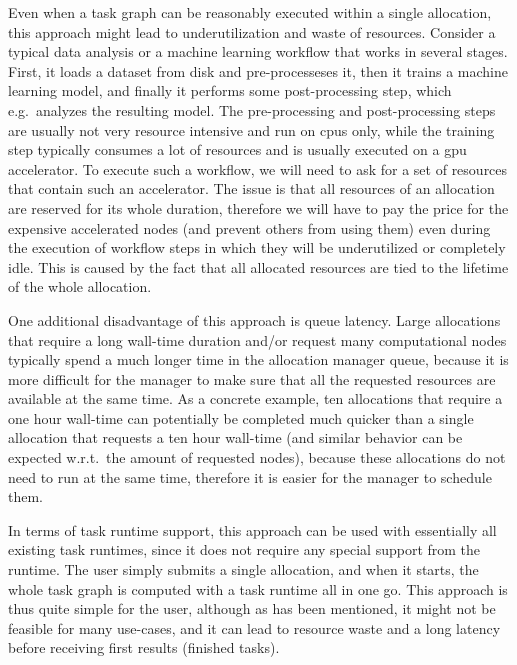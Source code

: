 Even when a task graph can be reasonably executed within a single allocation, this approach might
lead to underutilization and waste of resources. Consider a typical data analysis or a machine
learning workflow that works in several stages. First, it loads a dataset from disk and
pre-processeses it, then it trains a machine learning model, and finally it performs some
post-processing step, which e.g.\ analyzes the resulting model. The pre-processing and
post-processing steps are usually not very resource intensive and run on \glspl{cpu}
only, while the training step typically consumes a lot of resources and is usually executed on a
\gls{gpu} accelerator. To execute such a workflow, we will need to ask for a set
of resources that contain such an accelerator. The issue is that all resources of an allocation are
reserved for its whole duration, therefore we will have to pay the price for the expensive
accelerated nodes (and prevent others from using them) even during the execution of workflow steps
in which they will be underutilized or completely idle. This is caused by the fact that all
allocated resources are tied to the lifetime of the whole allocation.

One additional disadvantage of this approach is queue latency. Large allocations that require a
long wall-time duration and/or request many computational nodes typically spend a much longer time
in the allocation manager queue, because it is more difficult for the manager to make sure that all
the requested resources are available at the same time. As a concrete example, ten allocations that
require a one hour wall-time can potentially be completed much quicker than a single allocation
that requests a ten hour wall-time (and similar behavior can be expected w.r.t.\ the amount of
requested nodes), because these allocations do not need to run at the same time, therefore it is
easier for the manager to schedule them.

In terms of task runtime support, this approach can be used with essentially all existing task
runtimes, since it does not require any special support from the runtime. The user simply submits a
single allocation, and when it starts, the whole task graph is computed with a task runtime all in
one go. This approach is thus quite simple for the user, although as has been mentioned, it might
not be feasible for many use-cases, and it can lead to resource waste and a long latency before
receiving first results (finished tasks).

